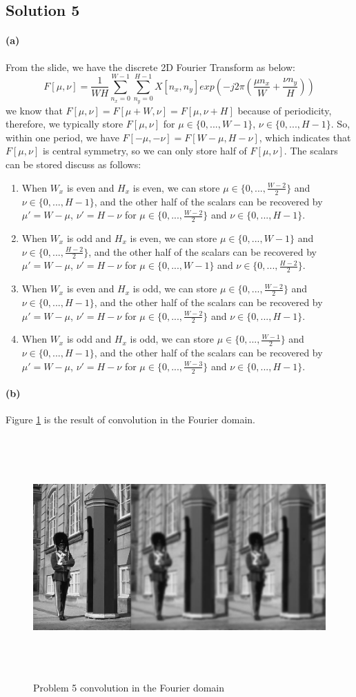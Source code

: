 \documentclass{article}
\newcommand{\solution}[1]{\clearpage \subsection*{Solution #1}}
\newcommand{\spart}[1]{\paragraph{(#1)}}
\begin{document}
\solution{5}
\spart{a} From the slide, we have the discrete 2D Fourier Transform as below:
$$
F[\mu,\nu] = \frac{1}{WH}\sum^{W-1}_{n_x=0}\sum^{H-1}_{n_y=0}X[n_x,n_y] exp(-j2\pi(\frac{\mu n_x}{W}+\frac{\nu n_y}{H}))
$$
we know that $F[\mu,\nu]=F[\mu + W,\nu]=F[\mu,\nu + H]$ because of periodicity, therefore, we typically store $F[\mu,\nu]$ for $\mu \in \{0,...,W-1\}$, $\nu \in \{0,...,H-1\}$. So, within one period, we have $F[-\mu,-\nu]=F[W-\mu,H-\nu]$, which indicates that $F[\mu,\nu]$ is central symmetry, so we can only store half of $F[\mu,\nu]$. The scalars can be stored discuss as follows:
\begin{enumerate}
\item When $W_x$ is even and $H_x$ is even, we can store $\mu \in \{0,...,\frac{W-2}{2}\}$ and $\nu \in \{0,...,H-1\}$, and the other half of the scalars can be recovered by $\mu' = W-\mu$, $\nu'=H-\nu$ for $\mu \in \{0,...,\frac{W-2}{2}\}$ and $\nu \in \{0,...,H-1\}$.
\item When $W_x$ is odd and $H_x$ is even, we can store $\mu \in \{0,...,W-1\}$ and $\nu \in \{0,...,\frac{H-2}{2}\}$, and the other half of the scalars can be recovered by $\mu' = W-\mu$, $\nu'=H-\nu$ for $\mu \in \{0,...,W-1\}$ and $\nu \in \{0,...,\frac{H-2}{2}\}$.
\item When $W_x$ is even and $H_x$ is odd, we can store $\mu \in \{0,...,\frac{W-2}{2}\}$ and $\nu \in \{0,...,H-1\}$, and the other half of the scalars can be recovered by $\mu' = W-\mu$, $\nu'=H-\nu$ for $\mu \in \{0,...,\frac{W-2}{2}\}$ and $\nu \in \{0,...,H-1\}$.
\item When $W_x$ is odd and $H_x$ is odd, we can store $\mu \in \{0,...,\frac{W-1}{2}\}$ and $\nu \in \{0,...,H-1\}$, and the other half of the scalars can be recovered by $\mu' = W-\mu$, $\nu'=H-\nu$ for $\mu \in \{0,...,\frac{W-3}{2}\}$ and $\nu \in \{0,...,H-1\}$.
\end{enumerate}
\spart{b} Figure \ref{fig:output5} is the result of convolution in the Fourier domain.
\begin{figure}[!h]
  \centering
    \includegraphics[height=25em]{code/outputs/prob5.jpg}
  \caption{Problem 5 convolution in the Fourier domain}
  \label{fig:output5}
\end{figure}
\end{document}
